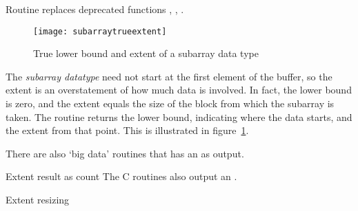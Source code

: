 \begin{remark}
  Routine 
  replaces
  deprecated functions ,
  , .
\end{remark}

\begin{figure}[ht]
  \texttt{[image: subarraytrueextent]}
  \caption{True lower bound and extent of a subarray data type}
  \label{fig:subtrue}
\end{figure}

The \emph{subarray datatype} need not
start at the first element of the buffer, so the extent is an
overstatement of how much data is involved.
In fact, the lower bound is zero,
and the extent equals the size of the block
from which the subarray is taken.
The routine
 returns the lower bound,
indicating where the data starts, and the extent from that point.
This is illustrated in figure~\ref{fig:subtrue}.


\begin{comment}
  Suppose we implement gather (see also Section Gather ) as a spanning
  tree implemented on top of point-to-point routines. Since the receive
  buffer is only valid on the root process, one will need to allocate
  some temporary space for receiving data on intermediate
  nodes. However, the datatype extent cannot be used as an estimate of
  the amount of space that needs to be allocated, if the user has
  modified the extent, for example by using MPI_TYPE_CREATE_RESIZED. The
  functions MPI_TYPE_GET_TRUE_EXTENT and MPI_TYPE_GET_TRUE_EXTENT_X are
  provided which return the true extent of the datatype.
\end{comment}

There are also `big data' routines
that has an  as output.

\begin{mpifournote}{Extent result as count}
  The C routines
  also output an .
\end{mpifournote}

 {Extent resizing}

